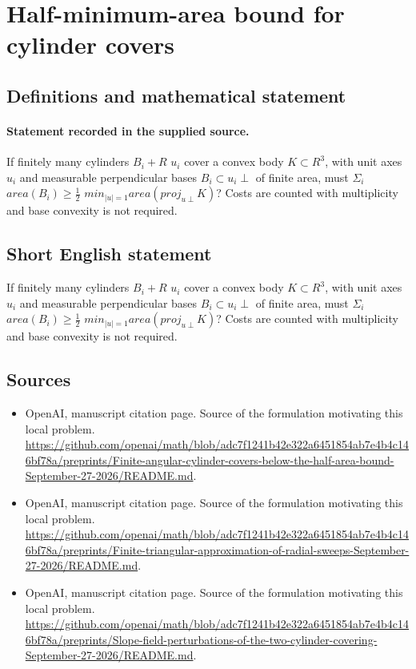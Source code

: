 \documentclass[11pt]{article}
\begin{document}
\section*{Half-minimum-area bound for cylinder covers}\label{statement}
\subsection{Definitions and mathematical statement}
\paragraph{Statement recorded in the supplied source.}
If finitely many cylinders $B_i+R$ $u_i$ cover a convex body $K\subset R^{3}$, with unit axes $u_i$ and measurable perpendicular bases $B_i\subset u_i\perp $ of finite area, must $\Sigma _i$ $area(B_i)\geq \tfrac12 $ $min_{|u|=1}area(proj_{u\perp }K)$? Costs are counted with multiplicity and base convexity is not required.
\subsection{Short English statement}
If finitely many cylinders $B_i+R$ $u_i$ cover a convex body $K\subset R^{3}$, with unit axes $u_i$ and measurable perpendicular bases $B_i\subset u_i\perp $ of finite area, must $\Sigma _i$ $area(B_i)\geq \tfrac12 $ $min_{|u|=1}area(proj_{u\perp }K)$? Costs are counted with multiplicity and base convexity is not required.
\subsection{Sources}
\begin{itemize}
\item[S1] OpenAI, manuscript citation page. Source of the formulation motivating this local problem.
\url{https://github.com/openai/math/blob/adc7f1241b42e322a6451854ab7e4b4c146bf78a/preprints/Finite-angular-cylinder-covers-below-the-half-area-bound-September-27-2026/README.md}.
\item[S2] OpenAI, manuscript citation page. Source of the formulation motivating this local problem.
\url{https://github.com/openai/math/blob/adc7f1241b42e322a6451854ab7e4b4c146bf78a/preprints/Finite-triangular-approximation-of-radial-sweeps-September-27-2026/README.md}.
\item[S3] OpenAI, manuscript citation page. Source of the formulation motivating this local problem.
\url{https://github.com/openai/math/blob/adc7f1241b42e322a6451854ab7e4b4c146bf78a/preprints/Slope-field-perturbations-of-the-two-cylinder-covering-September-27-2026/README.md}.
\end{itemize}
\end{document}
